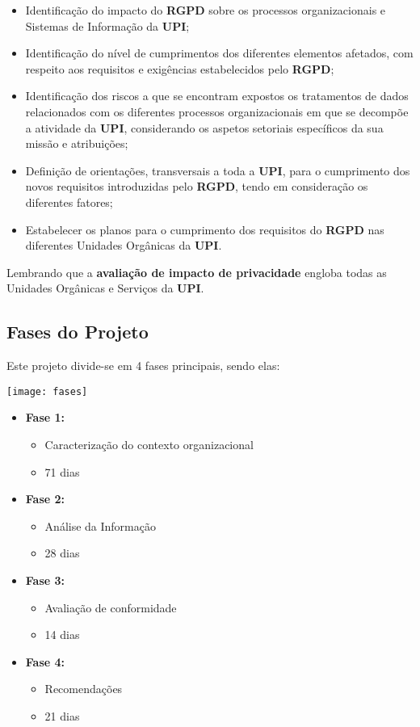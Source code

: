 \begin{itemize}
	\item Identificação do impacto do \textbf{RGPD} sobre os processos organizacionais e Sistemas de Informação da \textbf{UPI};
	\item Identificação do nível de cumprimentos dos diferentes elementos afetados, com respeito aos requisitos e exigências estabelecidos pelo \textbf{RGPD};
	\item Identificação dos riscos a que se encontram expostos os tratamentos de dados relacionados com os diferentes processos organizacionais em que se decompõe a atividade da \textbf{UPI}, considerando os aspetos setoriais específicos da sua missão e atribuições;
	\item Definição de orientações, transversais a toda a \textbf{UPI}, para o cumprimento dos novos requisitos introduzidas pelo \textbf{RGPD}, tendo em consideração os diferentes fatores;
	\item Estabelecer os planos para o cumprimento dos requisitos do \textbf{RGPD} nas diferentes Unidades Orgânicas da \textbf{UPI}.
\end{itemize}

Lembrando que a \textbf{avaliação de impacto de privacidade} engloba todas as Unidades Orgânicas e Serviços da \textbf{UPI}.


\subsection{Fases do Projeto}

Este projeto divide-se em 4 fases principais, sendo elas:

\begin{center}
	\texttt{[image: fases]}
\end{center}

\begin{itemize}
	\item \textbf{Fase 1:} 
		\begin{itemize}
			\item Caracterização do contexto organizacional
			\item 71 dias
		\end{itemize}
	\item \textbf{Fase 2:}
		\begin{itemize}
			\item Análise da Informação
			\item 28 dias
		\end{itemize}
	\item \textbf{Fase 3:}
		\begin{itemize}
			\item Avaliação de conformidade
			\item 14 dias
		\end{itemize}
	\item \textbf{Fase 4:}
		\begin{itemize}
			\item Recomendações
			\item 21 dias
		\end{itemize}
\end{itemize}